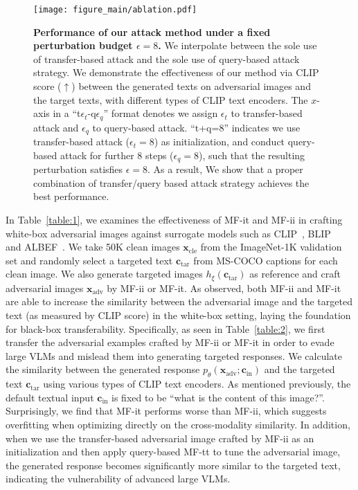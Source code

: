 \begin{figure}[t]
\vspace{-0.4cm}
    \centering
    \texttt{[image: figure\_main/ablation.pdf]}
    \caption{
    {\bf Performance of our attack method under a fixed perturbation budget $\epsilon=8$.} 
    We interpolate between the sole use of transfer-based attack and the sole use of query-based attack strategy. 
    We demonstrate the effectiveness of our method via CLIP score ($\uparrow$) between the generated texts on adversarial images and the target texts, with different types of CLIP text encoders. The $x$-axis in a ``t$\epsilon_{t}$-q$\epsilon_{q}$'' format denotes we assign $\epsilon_{t}$ to transfer-based attack and $\epsilon_{q}$ to query-based attack.
    ``t+q=8'' indicates we use transfer-based attack ($\epsilon_{t}=8$) as initialization, and conduct query-based attack for further 8 steps ($\epsilon_{q}=8$), such that the resulting perturbation satisfies $\epsilon=8$.
    As a result, We show that a proper combination of transfer/query based attack strategy achieves the best performance.
    }
    \label{fig:fixed_budget}
\end{figure}

In Table~\ref{table:1}, we examines the effectiveness of MF-it and MF-ii in crafting white-box adversarial images against surrogate models such as CLIP~\citep{radford2019language}, BLIP~\citep{li2022blip} and ALBEF~\citep{ALBEF}. 
We take 50K clean images $\boldsymbol{x}_\text{cle}$ from the ImageNet-1K validation set and randomly select a targeted text $\boldsymbol{c}_\text{tar}$ from MS-COCO captions for each clean image. 
We also generate targeted images $h_\xi(\boldsymbol{c}_\text{tar})$ as reference and craft adversarial images $\boldsymbol{x}_\text{adv}$ by MF-ii or MF-it. 
As observed, both MF-ii and MF-it are able to increase the similarity between the adversarial image and the targeted text (as measured by CLIP score) in the white-box setting, laying the foundation for black-box transferability. 
Specifically, as seen in Table~\ref{table:2}, we first transfer the adversarial examples crafted by MF-ii or MF-it in order to evade large VLMs and mislead them into generating targeted responses. 
We calculate the similarity between the generated response ${p_\theta}(\boldsymbol{x}_\text{adv};\boldsymbol{c}_{\text{in}})$ and the targeted text $\boldsymbol{c}_{\text{tar}}$ using various types of CLIP text encoders. 
As mentioned previously, the default textual input $\boldsymbol{c}_\text{in}$ is fixed to be ``what is the content of this image?''. Surprisingly, we find that MF-it performs worse than MF-ii, which suggests overfitting when optimizing directly on the cross-modality similarity. 
In addition, when we use the transfer-based adversarial image crafted by MF-ii as an initialization and then apply query-based MF-tt to tune the adversarial image, the generated response becomes significantly more similar to the targeted text, indicating the vulnerability of advanced large VLMs.

